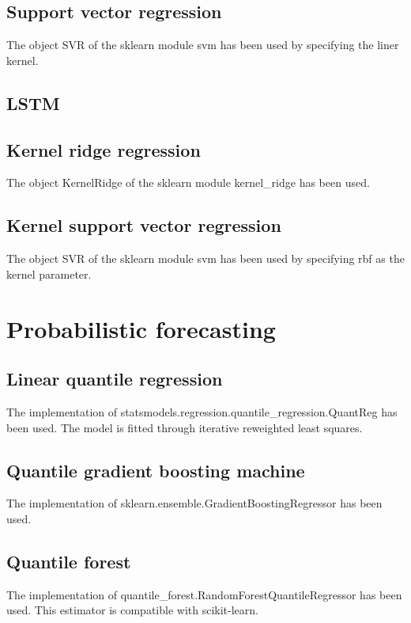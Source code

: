 \subsection{Support vector regression}
The object SVR of the sklearn module svm has been used by specifying the liner kernel.

\subsection{LSTM}


\subsection{Kernel ridge regression}
The object KernelRidge of the sklearn module kernel\_ridge has been used.

\subsection{Kernel support vector regression}
The object SVR of the sklearn module svm has been used by specifying rbf as the kernel parameter.

\section{Probabilistic forecasting}
\subsection{Linear quantile regression}
The implementation of statsmodels.regression.quantile\_regression.QuantReg has been used.
The model is fitted through iterative reweighted least squares.
\subsection{Quantile gradient boosting machine}
The implementation of sklearn.ensemble.GradientBoostingRegressor has been used.
\subsection{Quantile forest}
The implementation of quantile\_forest.RandomForestQuantileRegressor has been used. This estimator is compatible with scikit-learn.
